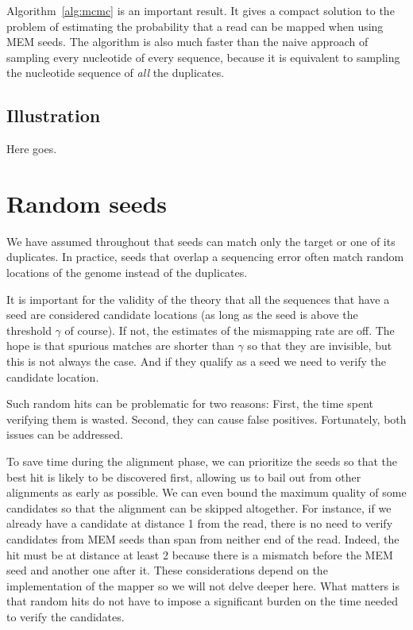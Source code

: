 \documentclass{article}
\begin{document}
Algorithm~\ref{alg:mcmc} is an important result. It gives a compact
solution to the problem of estimating the probability that a read can be
mapped when using MEM seeds. The algorithm is also much faster than the
naive approach of sampling every nucleotide of every sequence, because it
is equivalent to sampling the nucleotide sequence of \emph{all} the
duplicates.

\subsection{Illustration}

Here goes.

\section{Random seeds}
\label{sec:short_MEMs}

We have assumed throughout that seeds can match only the target or one of
its duplicates. In practice, seeds that overlap a sequencing error often
match random locations of the genome instead of the duplicates.

It is important for the validity of the theory that all the sequences that
have a seed are considered candidate locations (as long as the seed is
above the threshold $\gamma$ of course). If not, the estimates of the
mismapping rate are off. The hope is that spurious matches are shorter
than $\gamma$ so that they are invisible, but this is not always the case.
And if they qualify as a seed we need to verify the candidate location.

Such random hits can be problematic for two reasons: First, the time spent
verifying them is wasted. Second, they can cause false positives.
Fortunately, both issues can be addressed.

To save time during the alignment phase, we can prioritize the seeds so
that the best hit is likely to be discovered first, allowing us to bail
out from other alignments as early as possible. We can even bound
the maximum quality of some candidates so that the alignment can be
skipped altogether. For instance, if we already have a candidate at
distance 1 from the read, there is no need to verify candidates from MEM
seeds than span from neither end of the read. Indeed, the hit must be at
distance at least 2 because there is a mismatch before the MEM seed and
another one after it. These considerations depend on the implementation of
the mapper so we will not delve deeper here. What matters is that random
hits do not have to impose a significant burden on the time needed to
verify the candidates.
\end{document}
